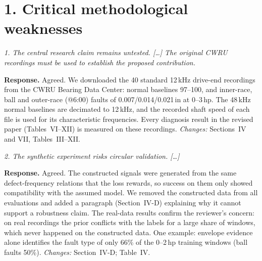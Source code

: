 \documentclass[11pt]{article}
\newenvironment{comment}{\par\medskip\noindent\begin{minipage}{\linewidth}\itshape\color{black!70}}{\end{minipage}\par\smallskip}
\begin{document}
\section*{1. Critical methodological weaknesses}

\begin{comment}
1. The central research claim remains untested. [\dots] The original CWRU
recordings must be used to establish the proposed contribution.
\end{comment}
\textbf{Response.} Agreed. We downloaded the 40 standard 12\,kHz drive-end
recordings from the CWRU Bearing Data Center: normal baselines 97--100, and
inner-race, ball and outer-race (@6:00) faults of 0.007/0.014/0.021\,in at
0--3\,hp. The 48\,kHz normal baselines are decimated to 12\,kHz, and the recorded
shaft speed of each file is used for its characteristic frequencies. Every
diagnosis result in the revised paper (Tables~VI--XII) is measured on these
recordings. \emph{Changes:} Sections~IV and VII, Tables~III--XII.

\begin{comment}
2. The synthetic experiment risks circular validation. [\dots]
\end{comment}
\textbf{Response.} Agreed. The constructed signals were generated from the same
defect-frequency relations that the loss rewards, so success on them only showed
compatibility with the assumed model. We removed the constructed data from all
evaluations and added a paragraph (Section~IV-D) explaining why it cannot support
a robustness claim. The real-data results confirm the reviewer's concern: on real
recordings the prior conflicts with the labels for a large share of windows,
which never happened on the constructed data. One example: envelope evidence alone
identifies the fault type of only 66\% of the 0--2\,hp training windows (ball
faults 50\%). \emph{Changes:} Section~IV-D; Table~IV.
\end{document}
